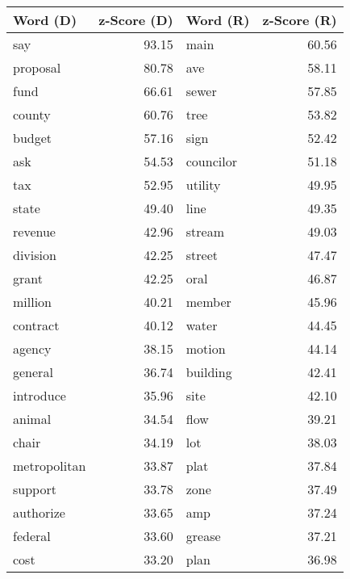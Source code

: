 \begin{table}[ht]
\centering
\begingroup\fontsize{8pt}{9pt}\selectfont
\begin{tabular}{lrlr}
  \hline
Word (D) & z-Score (D) & Word (R) & z-Score (R) \\ 
  \hline
say & 93.15 & main & 60.56 \\ 
  proposal & 80.78 & ave & 58.11 \\ 
  \cellcolor{blue!25}fund & 66.61 & \cellcolor{red!25}sewer & 57.85 \\ 
  county & 60.76 & \cellcolor{red!25}tree & 53.82 \\ 
  \cellcolor{blue!25}budget & 57.16 & \cellcolor{red!25}sign & 52.42 \\ 
  ask & 54.53 & councilor & 51.18 \\ 
  \cellcolor{blue!25}tax & 52.95 & \cellcolor{red!25}utility & 49.95 \\ 
  state & 49.40 & line & 49.35 \\ 
  \cellcolor{blue!25}revenue & 42.96 & stream & 49.03 \\ 
  division & 42.25 & \cellcolor{red!25}street & 47.47 \\ 
  \cellcolor{blue!25}grant & 42.25 & oral & 46.87 \\ 
  \cellcolor{blue!25}million & 40.21 & member & 45.96 \\ 
  contract & 40.12 &\cellcolor{red!25} water & 44.45 \\ 
  agency & 38.15 & motion & 44.14 \\ 
  general & 36.74 & \cellcolor{red!25}building & 42.41 \\ 
  introduce & 35.96 & \cellcolor{red!25}site & 42.10 \\ 
  \cellcolor{blue!25}animal & 34.54 & flow & 39.21 \\ 
  chair & 34.19 & lot & 38.03 \\ 
  metropolitan & 33.87 & plat & 37.84 \\ 
  support & 33.78 & \cellcolor{red!25}zone & 37.49 \\ 
  authorize & 33.65 & amp & 37.24 \\ 
  \cellcolor{blue!25}federal & 33.60 & grease & 37.21 \\ 
  \cellcolor{blue!25}cost & 33.20 & plan & 36.98 \\

\end{tabular}
\end{table}
